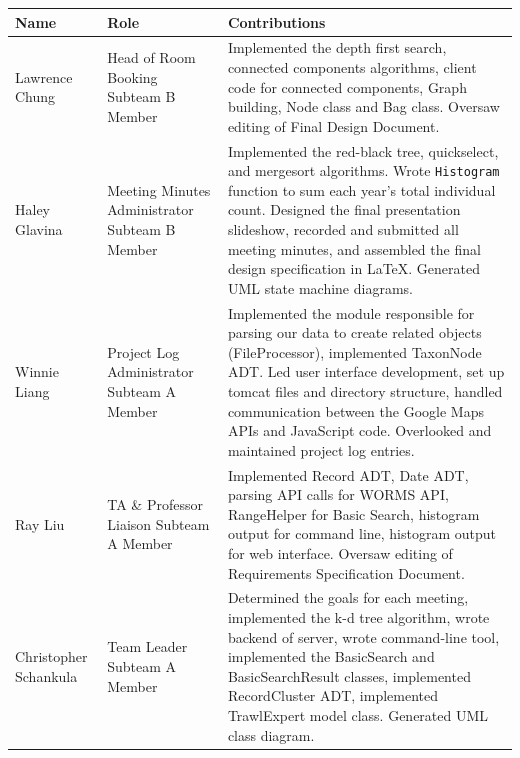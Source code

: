 \documentclass{article}
\begin{document}
\begin{table}[h]
	\centering
	\begin{tabular}{p{0.16\hsize}p{0.30\hsize}p{0.46\hsize}}
		\toprule
		\textbf{Name} & \textbf{Role} & \textbf{Contributions}\\
		\midrule
		Lawrence Chung
		& Head of Room Booking \newline Subteam B Member
		& Implemented the depth first search, connected components algorithms, client code for connected components, Graph building, Node class and Bag class. Oversaw editing of Final Design Document.\\
		\midrule
		Haley Glavina
		& Meeting Minutes Administrator \newline Subteam B Member
		& Implemented the red-black tree, quickselect, and mergesort algorithms. Wrote \texttt{Histogram} function to sum each year's total individual count. Designed the final presentation slideshow, recorded and submitted all meeting minutes, and assembled the final design specification in LaTeX. Generated UML state machine diagrams.\\
		\midrule
		Winnie Liang
		& Project Log Administrator \newline Subteam A Member
		& Implemented the module responsible for parsing our data to create related objects (FileProcessor), implemented TaxonNode ADT. Led user interface development, set up tomcat files and directory structure, handled communication between the Google Maps APIs and JavaScript code. Overlooked and maintained project log entries.\\
		\midrule
		Ray Liu
		& TA \& Professor Liaison \newline Subteam A Member
		& Implemented Record ADT, Date ADT, parsing API calls for WORMS API, RangeHelper for Basic Search, histogram output for command line, histogram output for web interface. Oversaw editing of Requirements Specification Document.\\
		\midrule
		Christopher Schankula
		& Team Leader \newline Subteam A Member
		& Determined the goals for each meeting, implemented the k-d tree algorithm, wrote backend of server, wrote command-line tool, implemented the BasicSearch and BasicSearchResult classes, implemented RecordCluster ADT, implemented TrawlExpert model class. Generated UML class diagram.\\		
		\bottomrule
	\end{tabular}
\end{table}
\end{document}

